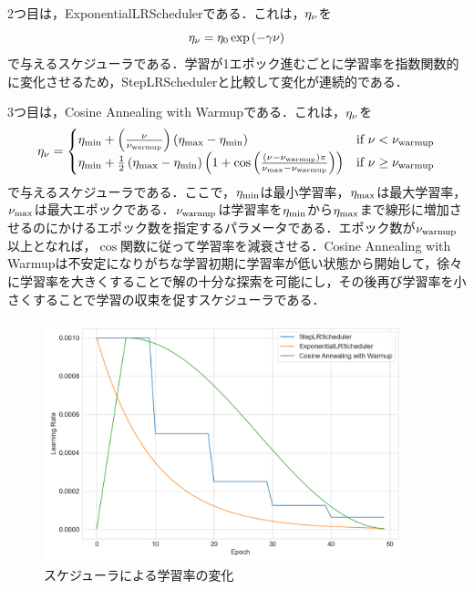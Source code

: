 2つ目は，ExponentialLRSchedulerである．これは，$\eta_{\nu}$を
\begin{equation}
    \eta_{\nu} = \eta_{0} \exp \left( -\gamma \nu \right)
\end{equation}
で与えるスケジューラである．学習が1エポック進むごとに学習率を指数関数的に変化させるため，StepLRSchedulerと比較して変化が連続的である．

3つ目は，Cosine Annealing with Warmupである．これは，$\eta_{\nu}$を
\begin{equation}
    \eta_{\nu} =
    \begin{cases}
        \eta_{\text{min}} + \left( \frac{\nu}{\nu_{\text{warmup}}} \right) \left(\eta_{\text{max}} - \eta_{\text{min}}\right)                                                                                    & \text{if $\nu < \nu_{\text{warmup}}$}   \\
        \eta_{\text{min}} + \frac{1}{2} \left(\eta_{\text{max}} - \eta_{\text{min}}\right) \left( 1 + \cos \left( \frac{\left(\nu - \nu_{\text{warmup}}\right)\pi}{\nu_{\text{max}} - \nu_{\text{warmup}}} \right) \right) & \text{if $\nu \ge \nu_{\text{warmup}}$}
    \end{cases}
\end{equation}
で与えるスケジューラである．ここで，$\eta_{\text{min}}$は最小学習率，$\eta_{\text{max}}$は最大学習率，$\nu_{\text{max}}$は最大エポックである．$\nu_{\text{warmup}}$は学習率を$\eta_{\text{min}}$から$\eta_{\text{max}}$まで線形に増加させるのにかけるエポック数を指定するパラメータである．エポック数が$\nu_{\text{warmup}}$以上となれば，$\cos$関数に従って学習率を減衰させる．Cosine Annealing with Warmupは不安定になりがちな学習初期に学習率が低い状態から開始して，徐々に学習率を大きくすることで解の十分な探索を可能にし，その後再び学習率を小さくすることで学習の収束を促すスケジューラである．

\begin{figure}[bt]
    \centering
    \includegraphics[height=70mm]{./figure/sec3/lr_scheduler.png}
    \caption{スケジューラによる学習率の変化}
    \label{sec3:fig:lr_scheduler}
\end{figure}

